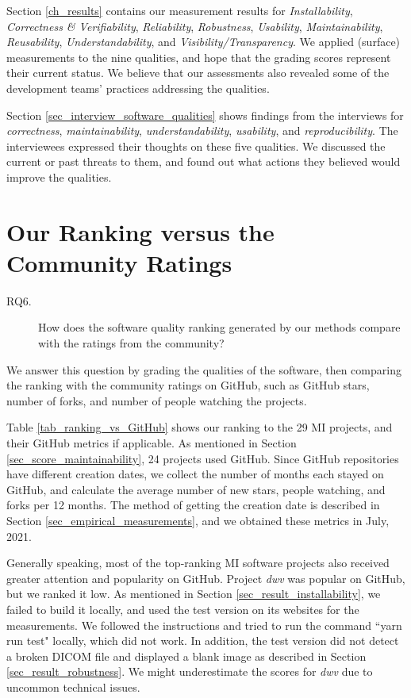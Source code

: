 Section \ref{ch_results} contains our measurement results for \textit{Installability}, \textit{Correctness \& Verifiability}, \textit{Reliability}, \textit{Robustness}, \textit{Usability}, \textit{Maintainability}, \textit{Reusability}, \textit{Understandability}, and \textit{Visibility/Transparency}. We applied (surface) measurements to the nine qualities, and hope that the grading scores represent their current status. We believe that our assessments also revealed some of the development teams' practices addressing the qualities. 

Section \ref{sec_interview_software_qualities} shows findings from the interviews for \textit{correctness}, \textit{maintainability}, \textit{understandability}, \textit{usability}, and \textit{reproducibility}. The interviewees expressed their thoughts on these five qualities. We discussed the current or past threats to them, and found out what actions they believed would improve the qualities.

\section{Our Ranking versus the Community Ratings}
\label{sec_rq6_comparison}
\begin{description}\item[RQ6.] How does the software quality ranking generated by our methods compare with the ratings from the community?\end{description}

We answer this question by grading the qualities of the software, then comparing the ranking with the community ratings on GitHub, such as GitHub stars, number of forks, and number of people watching the projects.

Table \ref{tab_ranking_vs_GitHub} shows our ranking to the 29 MI projects, and their GitHub metrics if applicable. As mentioned in Section \ref{sec_score_maintainability}, 24 projects used GitHub. Since GitHub repositories have different creation dates, we collect the number of months each stayed on GitHub, and calculate the average number of new stars, people watching, and forks per 12 months. The method of getting the creation date is described in Section \ref{sec_empirical_measurements}, and we obtained these metrics in July, 2021.

Generally speaking, most of the top-ranking MI software projects also received greater attention and popularity on GitHub. Project \textit{dwv} was popular on GitHub, but we ranked it low. As mentioned in Section \ref{sec_result_installability}, we failed to build it locally, and used the test version on its websites for the measurements. We followed the instructions and tried to run the command ``yarn run test" locally, which did not work. In addition, the test version did not detect a broken DICOM file and displayed a blank image as described in Section \ref{sec_result_robustness}. We might underestimate the scores for \textit{dwv} due to uncommon technical issues.

